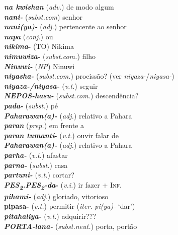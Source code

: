 \begin{multicols}{2}
\begin{hangparas}{1em}{1}
		\textbf{\emph{na kwishan}} (\emph{adv.}) \tabto{1em} de modo algum\\
		\textbf{\emph{nani-}} (\emph{subst.com}) \tabto{1em} senhor\\
		\textbf{\emph{nani(ya)-}} (\emph{adj.}) \tabto{1em} pertencente ao senhor\\
		\textbf{\emph{napa}} (\emph{conj.}) \tabto{1em} ou\\
		\textbf{\emph{nikima}-} (TO) \tabto{1em} Nikima\\
		\textbf{\emph{nimuwiza}-} (\emph{subst.com.}) \tabto{1em} filho\\
		\textbf{\emph{Ninuwi-}} (\emph{NP}) \tabto{1em} Ninuwi\\
		\textbf{\emph{niyasha-}} (\emph{subst.com.}) \tabto{1em} procissão? (ver \emph{niyaza}-/\emph{niyasa-})\\
		\textbf{\emph{niyaza-/niyasa-}} (\emph{v.t.}) \tabto{1em} seguir\\
		\textbf{\emph{\emph{NEPOS}-hasu-}} (\emph{subst.com.}) \tabto{1em} descendência?\\
		\textbf{\emph{pada-}} (\emph{subst.}) \tabto{1em} pé\\
		\textbf{\emph{Paharawan{(a)}-}} (\emph{adj.}) \tabto{1em} relativo a Pahara\\
		\textbf{\emph{paran}} (\emph{prep.}) \tabto{1em} em frente a\\
		\textbf{\emph{paran tumanti}-} (\emph{v.t.}) \tabto{1em} ouvir falar de\\
		\textbf{\emph{Paharawan{(a)}-}} (\emph{adj.}) \tabto{1em} relativo a Pahara\\
		\textbf{\emph{parha-}} (\emph{v.t.}) \tabto{1em} afastar\\
		\textbf{\emph{parna-}} (\emph{subst.}) \tabto{1em} casa\\
		\textbf{\emph{partuni-}} (\emph{v.t.}) \tabto{1em} cortar?\\
		\textbf{\emph{\emph{PES\textsubscript{2}.PES\textsubscript{2}}-da}-} (\emph{v.i.}) \tabto{1em} ir fazer + \textsc{Inf.}\\
		\textbf{\emph{pihami-}} (\emph{adj.}) \tabto{1em} gloriado, vitorioso\\
		\textbf{pipasa-} (\emph{v.t.}) \tabto{1em} permitir (\emph{iter.} \emph{pi{(ya)}-} `dar')\\
		\textbf{\emph{pitahaliya-}} (\emph{v.t.}) \tabto{1em} adquirir???\\
		\textbf{\emph{\emph{PORTA}-lana-}} (\emph{subst.neut.}) \tabto{1em} porta, portão\\

\end{hangparas}
\end{multicols}
